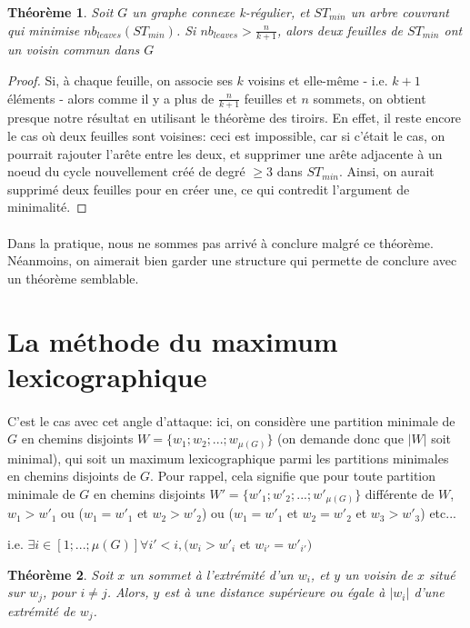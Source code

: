 \documentclass[a4paper]{article}
\newtheorem{theorem}{Théorème}
\theoremstyle{definition}
\theoremstyle{remark}
\begin{document}
\begin{theorem}
Soit $G$ un graphe connexe k-régulier, et $ST_{min}$ un arbre couvrant 
qui minimise $nb_{leaves}(ST_{min})$. Si $nb_{leaves} > \frac{n}{k+1}$,
alors deux feuilles de $ST_{min}$ ont un voisin commun dans $G$
\end{theorem}
\begin{proof}
Si, à chaque feuille, on associe ses $k$ voisins et elle-même - i.e. $k+1$ éléments - alors comme il y a plus de $\frac{n}{k+1}$ feuilles et $n$
sommets, on obtient presque notre résultat en utilisant le théorème des
tiroirs. En effet, il reste encore le cas où deux feuilles sont
voisines: ceci est impossible, car si c'était le cas, on pourrait 
rajouter l'arête entre les deux, et supprimer une arête adjacente à un
noeud du cycle nouvellement créé de degré $\geq 3$ dans $ST_{min}$. 
Ainsi, on aurait supprimé deux feuilles pour en créer une, ce qui contredit
l'argument de minimalité.
\end{proof}

\paragraph{}
Dans la pratique, nous ne sommes pas arrivé à conclure malgré ce théorème. Néanmoins, on aimerait bien garder une structure qui permette
de conclure avec un théorème semblable.

\section{La méthode du maximum lexicographique}

\paragraph{}
C'est le cas avec cet angle d'attaque: ici, on considère une partition minimale de $G$ en chemins disjoints $W = \{w_{1};w_{2};...;w_{\mu(G)}\}$ (on demande donc que $|W|$ soit minimal), qui soit un maximum 
lexicographique parmi les partitions minimales en chemins disjoints de $G$. Pour rappel, cela signifie que pour toute partition minimale de $G$ 
en chemins disjoints $W'=\{w'_{1};w'_{2};...;w'_{\mu(G)}\}$ différente de $W$, $w_{1} > w'_{1}$ ou ($w_{1}=w'_{1}$ et $w_{2} > w'_{2}$) ou ($w_{1}=w'_{1}$ et $w_{2} = w'_{2}$ et $w_{3} > w'_{3}$) etc...

i.e. $\exists i \in [1;...;\mu(G)] \forall i' < i, (w_{i} > w'_{i}$ et $w_{i'}=w'_{i'})$

\begin{theorem}
Soit $x$ un sommet à l'extrémité d'un $w_{i}$, et $y$ un voisin de $x$
situé sur $w_{j}$, pour $i \neq j$. Alors, $y$ est à une distance supérieure ou égale à $|w_{i}|$ d'une extrémité de $w_{j}$.
\end{theorem}
\end{document}
